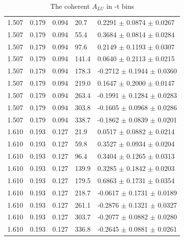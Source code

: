 \begin{table}[!h]
\begin{center}
\begin{tabular}{||l|l|l|l|l||}
  1.507 & 0.179 & 0.094 & 20.7  &  0.2291 $\pm$ 0.0874 $\pm$ 0.0267 \\
  1.507 & 0.179 & 0.094 & 55.4  &  0.3684 $\pm$ 0.0814 $\pm$ 0.0284 \\
  1.507 & 0.179 & 0.094 & 97.6  &  0.2149 $\pm$ 0.1193 $\pm$ 0.0307 \\
  1.507 & 0.179 & 0.094 & 141.4 &  0.0640 $\pm$ 0.2113 $\pm$ 0.0215 \\
  1.507 & 0.179 & 0.094 & 178.3 & -0.2712 $\pm$ 0.1944 $\pm$ 0.0360 \\
  1.507 & 0.179 & 0.094 & 219.0 &  0.1647 $\pm$ 0.2000 $\pm$ 0.0147 \\
  1.507 & 0.179 & 0.094 & 263.4 & -0.1991 $\pm$ 0.1284 $\pm$ 0.0283 \\
  1.507 & 0.179 & 0.094 & 303.8 & -0.1605 $\pm$ 0.0968 $\pm$ 0.0286 \\
  1.507 & 0.179 & 0.094 & 338.7 & -0.1862 $\pm$ 0.0839 $\pm$ 0.0201 \\
\hline                                                                
  1.610 & 0.193 & 0.127 & 21.9  &  0.0517 $\pm$ 0.0882 $\pm$ 0.0214 \\
  1.610 & 0.193 & 0.127 & 59.8  &  0.3527 $\pm$ 0.0934 $\pm$ 0.0204 \\
  1.610 & 0.193 & 0.127 & 96.4  &  0.3404 $\pm$ 0.1265 $\pm$ 0.0313 \\
  1.610 & 0.193 & 0.127 & 139.9 &  0.3285 $\pm$ 0.1842 $\pm$ 0.0203 \\
  1.610 & 0.193 & 0.127 & 179.5 &  0.6863 $\pm$ 0.1731 $\pm$ 0.0354 \\
  1.610 & 0.193 & 0.127 & 218.7 & -0.0617 $\pm$ 0.1731 $\pm$ 0.0189 \\
  1.610 & 0.193 & 0.127 & 261.1 & -0.2876 $\pm$ 0.1321 $\pm$ 0.0327 \\
  1.610 & 0.193 & 0.127 & 303.7 & -0.2077 $\pm$ 0.0882 $\pm$ 0.0280 \\
  1.610 & 0.193 & 0.127 & 336.8 & -0.2645 $\pm$ 0.0881 $\pm$ 0.0261 \\
         
         \hline
         \hline
      \end{tabular}
      \caption{The coherent $A_{LU}$ in -t bins}
      \label{table:Coh_t_BSA}
   \end{center}
\end{table}


